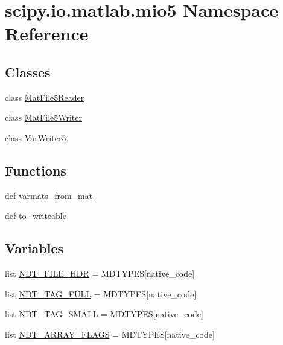 \hypertarget{namespacescipy_1_1io_1_1matlab_1_1mio5}{}\section{scipy.\+io.\+matlab.\+mio5 Namespace Reference}
\label{namespacescipy_1_1io_1_1matlab_1_1mio5}
\subsection*{Classes}
\begin{DoxyCompactItemize}
\item 
class \hyperlink{classscipy_1_1io_1_1matlab_1_1mio5_1_1MatFile5Reader}{Mat\+File5\+Reader}
\item 
class \hyperlink{classscipy_1_1io_1_1matlab_1_1mio5_1_1MatFile5Writer}{Mat\+File5\+Writer}
\item 
class \hyperlink{classscipy_1_1io_1_1matlab_1_1mio5_1_1VarWriter5}{Var\+Writer5}
\end{DoxyCompactItemize}
\subsection*{Functions}
\begin{DoxyCompactItemize}
\item 
def \hyperlink{namespacescipy_1_1io_1_1matlab_1_1mio5_a7ee100cf2d0330aabd8a3926a47ba1b4}{varmats\+\_\+from\+\_\+mat}
\item 
def \hyperlink{namespacescipy_1_1io_1_1matlab_1_1mio5_a8c4dd2e2f6519a465bfef7e268142a52}{to\+\_\+writeable}
\end{DoxyCompactItemize}
\subsection*{Variables}
\begin{DoxyCompactItemize}
\item 
list \hyperlink{namespacescipy_1_1io_1_1matlab_1_1mio5_af9703c91d1b044e498a2d282bf8bddad}{N\+D\+T\+\_\+\+F\+I\+L\+E\+\_\+\+H\+D\+R} = M\+D\+T\+Y\+P\+E\+S\mbox{[}native\+\_\+code\mbox{]}
\item 
list \hyperlink{namespacescipy_1_1io_1_1matlab_1_1mio5_a993ddce5977df6877558bfe56bdc4f55}{N\+D\+T\+\_\+\+T\+A\+G\+\_\+\+F\+U\+L\+L} = M\+D\+T\+Y\+P\+E\+S\mbox{[}native\+\_\+code\mbox{]}
\item 
list \hyperlink{namespacescipy_1_1io_1_1matlab_1_1mio5_a26ce091544ce1effcfb5276bad77e7a3}{N\+D\+T\+\_\+\+T\+A\+G\+\_\+\+S\+M\+A\+L\+L} = M\+D\+T\+Y\+P\+E\+S\mbox{[}native\+\_\+code\mbox{]}
\item 
list \hyperlink{namespacescipy_1_1io_1_1matlab_1_1mio5_a48b9e8b742352906b241bb04cdfe2ed2}{N\+D\+T\+\_\+\+A\+R\+R\+A\+Y\+\_\+\+F\+L\+A\+G\+S} = M\+D\+T\+Y\+P\+E\+S\mbox{[}native\+\_\+code\mbox{]}
\end{DoxyCompactItemize}


